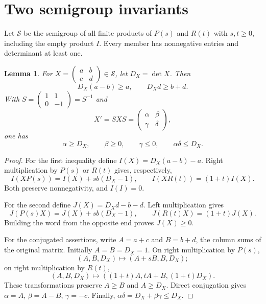 \documentclass[11pt]{article}
\newtheorem{lemma}[theorem]{Lemma}
\begin{document}
\section{Two semigroup invariants}
Let $\mathcal S$ be the semigroup of all finite products of $P(s)$ and $R(t)$ with $s,t\ge0$, including the empty product $I$. Every member has nonnegative entries and determinant at least one.

\begin{lemma}\label{lem:invariants}
For $X=\left(\begin{smallmatrix}a&b\\c&d\end{smallmatrix}\right)\in\mathcal S$, let $D_X=\det X$. Then
\begin{equation}\label{eq:uv}
 D_X(a-b)\ge a,\qquad D_Xd\ge b+d.
\end{equation}
With $S=\left(\begin{smallmatrix}1&1\\0&-1\end{smallmatrix}\right)=S^{-1}$ and
\[
 X'=SXS=\begin{pmatrix}\alpha&\beta\\\gamma&\delta\end{pmatrix},
\]
one has
\begin{equation}\label{eq:conj}
 \alpha\ge D_X,\qquad \beta\ge0,\qquad\gamma\le0,
 \qquad \alpha\delta\le D_X.
\end{equation}
\end{lemma}
\begin{proof}
For the first inequality define $I(X)=D_X(a-b)-a$. Right multiplication by $P(s)$ or $R(t)$ gives, respectively,
\[
 I(XP(s))=I(X)+s b(D_X-1),\qquad I(XR(t))=(1+t)I(X).
\]
Both preserve nonnegativity, and $I(I)=0$.

For the second define $J(X)=D_Xd-b-d$. Left multiplication gives
\[
 J(P(s)X)=J(X)+s b(D_X-1),\qquad J(R(t)X)=(1+t)J(X).
\]
Building the word from the opposite end proves $J(X)\ge0$.

For the conjugated assertions, write $A=a+c$ and $B=b+d$, the column sums of the original matrix. Initially $A=B=D_X=1$. On right multiplication by $P(s)$,
\[
 (A,B,D_X)\longmapsto(A+sB,B,D_X);
\]
on right multiplication by $R(t)$,
\[
 (A,B,D_X)\longmapsto((1+t)A,tA+B,(1+t)D_X).
\]
These transformations preserve $A\ge B$ and $A\ge D_X$. Direct conjugation gives $\alpha=A$, $\beta=A-B$, $\gamma=-c$. Finally, $\alpha\delta=D_X+\beta\gamma\le D_X$.
\end{proof}
\end{document}
